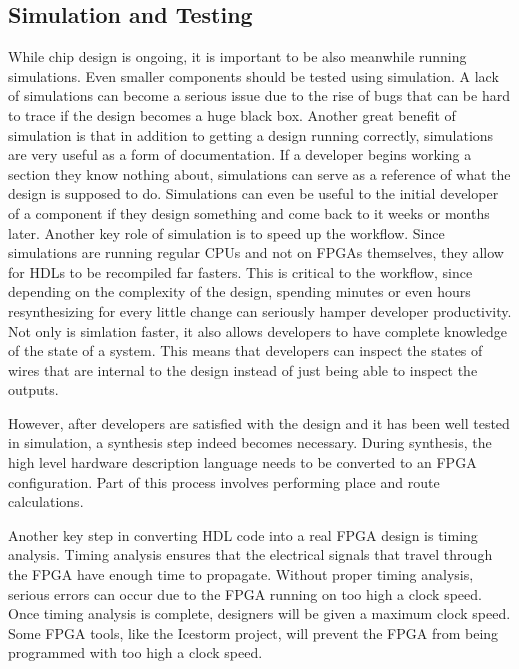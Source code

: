 \documentclass{article}
\begin{document}
    \subsection{Simulation and Testing}

    While chip design is ongoing, it is important to be also meanwhile running simulations.
    Even smaller components should be tested using simulation. A lack of simulations
    can become a serious issue due to the rise of bugs that can be hard to trace if
    the design becomes a huge black box. Another great benefit of simulation is that
    in addition to getting a design running correctly, simulations are very useful
    as a form of documentation. If a developer begins working a section they know nothing
    about, simulations can serve as a reference of what the design is supposed to do.
    Simulations can even be useful to the initial developer of a component if they design
    something and come back to it weeks or months later.
    Another key role of simulation is to speed up the workflow. Since simulations
    are running regular CPUs and not on FPGAs themselves, they allow for HDLs to
    be recompiled far fasters. This is critical to the workflow, since depending on
    the complexity of the design, spending minutes or even hours resynthesizing for
    every little change can seriously hamper developer productivity.
    Not only is simlation faster, it also allows developers to have complete knowledge
    of the state of a system. This means that developers can inspect the states
    of wires that are internal to the design instead of just being able to inspect the
    outputs.

    However, after developers are satisfied with the design and it has been well tested
    in simulation, a synthesis step indeed becomes necessary.
    During synthesis, the high level hardware description language needs to be converted
    to an FPGA configuration. Part of this process involves performing place and route
    calculations.

    Another key step in converting HDL code into a real FPGA design is timing analysis.
    Timing analysis ensures that the electrical signals that travel through the FPGA
    have enough time to propagate. Without proper timing analysis, serious errors
    can occur due to the FPGA running on too high a clock speed. Once timing analysis
    is complete, designers will be given a maximum clock speed.
    Some FPGA tools, like the Icestorm project, will prevent the FPGA from being
    programmed with too high a clock speed.
    
\end{document}
